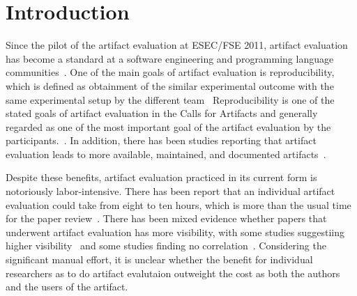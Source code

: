 \section{Introduction}
\label{s:introduction}

Since the pilot of the artifact evaluation at ESEC/FSE 2011, artifact evaluation has become a standard at a software engineering and programming language communities~\cite{Krishnamurthi2015TheRS}.
One of the main goals of artifact evaluation is reproducibility, which is defined as obtainment of the similar experimental outcome with the same experimental setup by the different team~\cite{acm-artifact-badging-v1_1}
Reproducibility is one of the stated goals of artifact evaluation in the Calls for Artifacts and generally regarded as one of the most important goal of the artifact evaluation by the participants.~\cite{Hermann2020CommunityEF}.
In addition, there has been studies reporting that artifact evaluation leads to more available, maintained, and documented artifacts~\cite{Winter2022ARS}.

Despite these benefits, artifact evaluation practiced in its current form is notoriously labor-intensive.
There has been report that an individual artifact evaluation could take from eight to ten hours, which is more than the usual time for the paper review~\cite{Hermann2022WhatHA}.
There has been mixed evidence whether papers that underwent artifact evaluation has more visibility, with some studies suggestiing higher visibility~\cite{Heumller2020PublishOP} and some studies finding no correlation~\cite{Winter2022ARS}.
Considering the significant manual effort, it is unclear whether the benefit for individual researchers as to do artifact evalutaion outweight the cost as both the authors and the users of the artifact.

